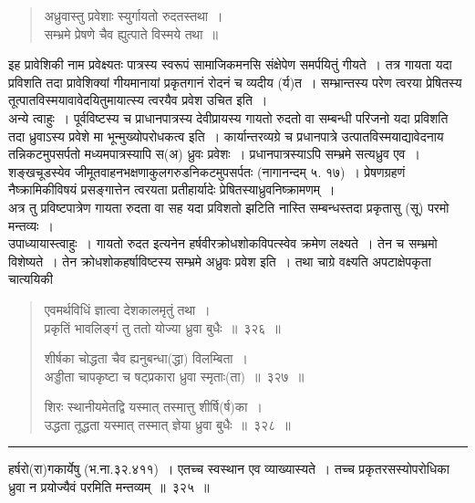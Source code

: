 \documentclass[11pt, openany]{book}
\begin{document}
\begin{quote}
{\qt अध्रुवास्तु प्रवेशाः स्युर्गायतो रुदतस्तथा~।\\
 सम्भ्रमे प्रेषणे चैव ह्युत्पाते विस्मये तथा~॥}
\end{quote}

\noindent
इह {\qtt प्रावेशिकी} नाम प्रवेक्ष्यतः पात्रस्य स्वरूपं सामाजिकमनसि संक्षेपेण समर्पयितुं गीयते~। तत्र गायता यदा प्रविशति तदा प्रावेशिक्यां गीयमानायां प्रकृतगानं रोदनं च व्यदीय (र्य)त~। सम्भ्रान्तस्य परेण त्वरया प्रेषितस्य तूत्पातविस्मयावावेदयितुमायात्स्य त्वरयैव प्रवेश उचित इति~।\\

{\qtt अन्ये} त्वाहुः~। पूर्वविष्टस्य च प्राधानपात्रस्य देवीप्रायस्य {\qtt गायतो रुदतो} वा सम्बन्धी परिजनो यदा प्रविशति तदा ध्रुवाऽस्य प्रवेशे मा भून्मुख्योपरोधकत्व इति~। कार्यान्तरव्यग्रे च प्रधानपात्रे उत्पातविस्मयाद्यावेदनाय तन्निकटमुपसर्पतो मध्यमपात्रस्यापि स(अ) ध्रुवः प्रवेशः~। प्रधानपात्रस्याऽपि सम्भ्रमे सत्यध्रुव एव~। शङ्खचूडस्येव जीमूतवाहनभक्षणाकुलगरुडनिकटमुपसर्पतः (नागानन्दम् ५. १७)~। प्रेषणग्रहणं नैष्क्रामिकीविषयं प्रसङ्गात्तेन त्वरयता प्रतीहार्यादेः प्रेषितस्याध्रुवनिष्क्रामणम्~।\\

अत्र तु प्रविष्टपात्रेण गायता रुदता वा सह यदा प्रविशतो झटिति नास्ति सम्बन्धस्तदा प्रकृतासु (सू) परमो मन्तव्यः~।\\

{\qtt उपाध्याया}स्त्वाहुः~। {\qtt गायतो रुदत} इत्यनेन हर्षवीरक्रोधशोकविपत्स्वेव क्रमेण लक्ष्यते~। तेन च {\qtt सम्भ्रमो} विशेष्यते~। तेन क्रोधशोकहर्षाविष्टस्य सम्भ्रमे अध्रुवः प्रवेश इति~। तथा चाग्रे वक्ष्यति {\qtt अपटाक्षेपकृता चात्ययिकी}

\newpage

\begin{quote}
{\na एवमर्थविधिं ज्ञात्वा देशकालमृतुं तथा~।\\
 प्रकृतिं भावलिङ्गं तु ततो योज्या ध्रुवा बुधैः~॥~३२६~॥

 शीर्षका चोद्धता चैव ह्यनुबन्धा(द्धा) विलम्बिता~। \\
 अड्डीता चापकृष्टा च षट्प्रकारा ध्रुवा स्मृताः(ता)~॥~३२७~॥

 शिरः स्थानीयमेतद्वि यस्मात् तस्मात्तु शीर्षि(र्ष)का~।\\
 उद्धता तूद्धता यस्मात् तस्मात् ज्ञेया ध्रुवा बुधैः~॥~३२८~॥}
\end{quote}

\hrule

\vspace{2mm}
\noindent
{\qtt हर्षरो(रा)गकार्येषु} (भ.ना.३२.४११)~। एतच्च स्वस्थान एव व्याख्यास्यते~। तच्च प्रकृतरसस्योपरोधिका ध्रुवा न प्रयोज्यैवं परमिति मन्तव्यम्~॥~३२५~॥\\
\end{document}
